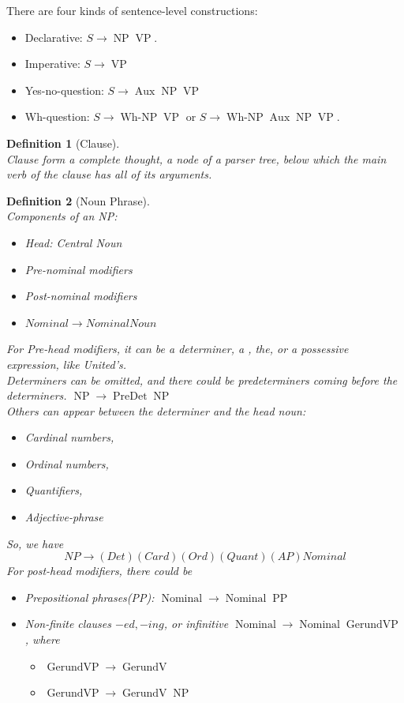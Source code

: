 \documentclass[12pt]{article}
\newtheorem{definition}{Definition}[section]
\theoremstyle{definition}
\DeclareMathOperator{\NP}{NP}
\DeclareMathOperator{\VP}{VP}
\DeclareMathOperator{\WhNP}{Wh-NP}
\DeclareMathOperator{\Aux}{Aux}
\DeclareMathOperator{\GerundVP}{GerundVP}
\DeclareMathOperator{\GerundV}{GerundV}
\DeclareMathOperator{\PP}{PP}
\DeclareMathOperator{\PreDet}{PreDet}
\DeclareMathOperator{\Nominal}{Nominal}
\begin{document}
There are four kinds of sentence-level constructions:
\begin{itemize}
	\item Declarative: $S\to \NP \VP$.
	\item Imperative: $S\to \VP$
	\item Yes-no-question: $S\to \Aux \NP \VP$
	\item Wh-question: $S\to \WhNP \VP$ or $S\to \WhNP \Aux \NP \VP$.
\end{itemize}
\begin{definition}[Clause]
\hfill\\\normalfont Clause form a complete thought, a node of a parser tree, below which the main verb of the clause has all of its arguments.
\end{definition}
\begin{definition}[Noun Phrase]
\hfill\\\normalfont Components of an NP:
\begin{itemize}
	\item Head: Central Noun
	\item Pre-nominal modifiers
	\item Post-nominal modifiers
	\item $Nominal \to Nominal Noun$
\end{itemize}
For Pre-head modifiers, it can be a determiner, a , the, or a possessive expression, like United's.\\
Determiners can be omitted, and there could be predeterminers coming before the determiners. $\NP\to \PreDet \NP$\\
Others can appear between the determiner and the head noun:
\begin{itemize}
	\item Cardinal numbers, 
	\item Ordinal numbers,
	\item Quantifiers,
	\item Adjective-phrase
\end{itemize}
So, we have
\[
NP\to (Det) (Card) (Ord) (Quant)(AP) Nominal
\]
For post-head modifiers, there could be
\begin{itemize}
	\item Prepositional phrases(PP): $\Nominal \to \Nominal \PP$ 
	\item Non-finite clauses $-ed, -ing$, or infinitive $\Nominal \to \Nominal \GerundVP$, where
	\begin{itemize}
		\item $\GerundVP \to \GerundV$
		\item $\GerundVP \to \GerundV \NP$

\end{itemize}
\end{itemize}
\end{definition}
\end{document}
